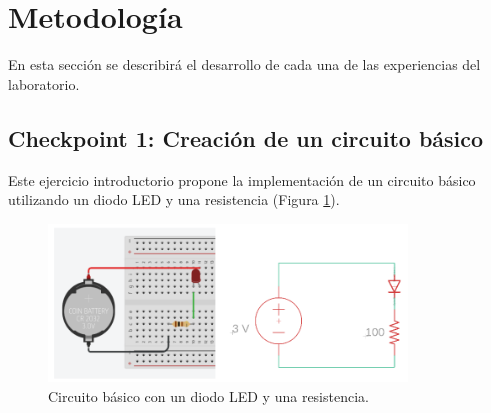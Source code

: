 \documentclass{article}
\begin{document}
\section{Metodolog\'ia}

En esta sección se describir\'a el desarrollo de cada una de las experiencias del laboratorio.

\subsection{Checkpoint 1: Creación de un circuito b\'asico}

Este ejercicio introductorio propone la implementación de un circuito b\'asico utilizando un diodo LED y una resistencia (Figura \ref{fig:circuito_basico}). 

\begin{figure}[H]
    \centering
    \includegraphics[width=0.85\textwidth]{./img/ckpt_1_0.png}
    \caption{Circuito b\'asico con un diodo LED y una resistencia.}
    \label{fig:circuito_basico}
\end{figure}
\end{document}
